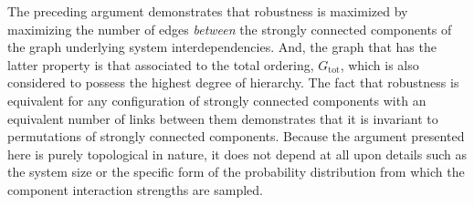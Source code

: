 

The preceding argument demonstrates that robustness is
maximized by maximizing the number of edges \emph{between} the strongly
connected components of the graph underlying system interdependencies.
And, the graph that has the latter property is that associated to the total
ordering, $G_{\mathrm{tot}}$, which is also considered to possess the highest degree of hierarchy. The fact that robustness is equivalent for any configuration of strongly connected components with an equivalent number of links between them demonstrates that it is invariant to permutations of
strongly connected components. Because the argument presented here is purely topological in nature, it does not depend at all upon details such as the system size or the specific form of the probability distribution from which the component interaction strengths are sampled.
